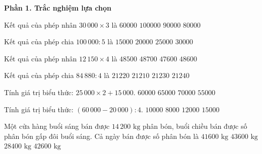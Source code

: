 \textbf{Phần 1. Trắc nghiệm lựa chọn}

\begin{ex} %
Kết quả của phép nhân $30\,000 \times 3$ là
\choice
{$60000$}
{$100000$}
{\True $90000$}
{$80000$}
\end{ex}

\begin{ex} %
Kết quả của phép chia $100\,000 : 5$ là
\choice
{$15000$}
{\True $20000$}
{$25000$}
{$30000$}
\end{ex}

\begin{ex} %
Kết quả của phép nhân $12\,150 \times 4$ là
\choice
{$48500$}
{$48700$}
{$47600$}
{\True $48600$}
\end{ex}

\begin{ex} %
Kết quả của phép chia $84\,880 : 4$ là
\choice
{\True $21220$}
{$21210$}
{$21230$}
{$21240$}
\end{ex}

\begin{ex} %
Tính giá trị biểu thức: $25\,000 \times 2 + 15\,000$.
\choice
{$60000$}
{\True $65000$}
{$70000$}
{$55000$}
\end{ex}

\begin{ex} %
Tính giá trị biểu thức: $(60\,000 - 20\,000) : 4$.
\choice
{\True $10000$}
{$8000$}
{$12000$}
{$15000$}
\end{ex}

\begin{ex} %
Một cửa hàng buổi sáng bán được $14\,200\text{ kg}$ phân bón, buổi chiều bán được số phân bón gấp đôi buổi sáng. Cả ngày bán được số phân bón là
\choice
{$41600\text{ kg}$}
{$43600\text{ kg}$}
{$28400\text{ kg}$}
{\True $42600\text{ kg}$}
\end{ex}

